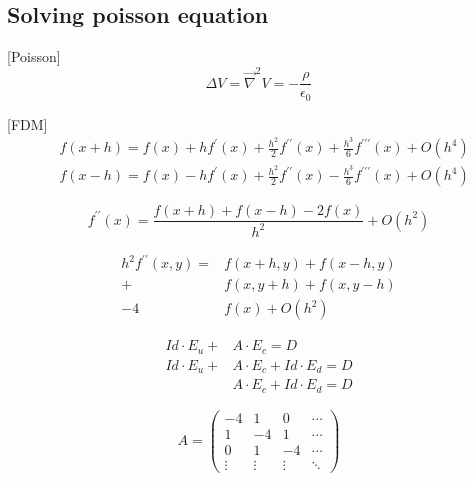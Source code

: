 \begin{refsection}
	\subsection{Solving poisson equation}
	[Poisson]
	\begin{equation}
		\Delta V = \overrightarrow{\nabla}^{2}V = -\frac{\rho}{\epsilon_{0}}
	\end{equation}

	[FDM]
	\begin{align}
		 & f(x+h) = f(x)+hf^{\prime}(x)
		+\frac{h^2}{2}f^{\prime\prime}(x)+\frac{h^3}{6}f^{\prime\prime\prime}(x) + O(h^{4}) \\
		 & f(x-h) = f(x)-hf^{\prime}(x)
		+\frac{h^2}{2}f^{\prime\prime}(x)-\frac{h^3}{6}f^{\prime\prime\prime}(x) + O(h^{4})
	\end{align}

	\begin{equation}
		f^{\prime\prime}(x) = \frac{f(x+h) + f(x-h) - 2f(x)}{h^{2}} + O(h^{2})
	\end{equation}

	\begin{equation}
		\begin{split}
			h^{2}f^{\prime\prime}(x,y)=&f(x+h,y) + f(x-h,y) \\
			+ &f(x,y+h) + f(x,y-h) \\
			- 4&f(x)+ O(h^{2})
		\end{split}
	\end{equation}

	\begin{align}
		Id \cdot E_{u} + & A \cdot E_{c} = D                  \\
		Id \cdot E_{u} + & A \cdot E_{c} + Id \cdot E_{d} = D \\
		                 & A \cdot E_{c} + Id \cdot E_{d} = D
	\end{align}

	\begin{equation}
		A =
		\begin{pmatrix}
			-4      & 1      & 0      & \cdots \\
			1      & -4      & 1      & \cdots \\
			0      & 1      & -4      & \cdots \\
			\vdots & \vdots & \vdots & \ddots
		\end{pmatrix}
	\end{equation}


\end{refsection}
